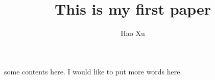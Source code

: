 \documentclass{article}
\title{This is my first paper}
\author{Hao Xu}
\begin{document}
    some contents here.
    I would like to put more words here.
\end{document}
